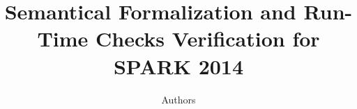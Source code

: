 \documentclass{llncs}
\begin{document}
\title{Semantical Formalization and Run-Time Checks Verification for SPARK 2014}


\author{Authors}

    
\maketitle













% 
% 
\end{document}
